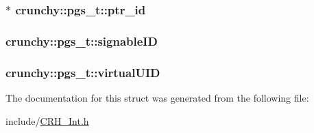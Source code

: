 \subsubsection[{ptr\+\_\+id}]{$\ast$ crunchy\+::pgs\+\_\+t\+::ptr\+\_\+id}\hypertarget{structcrunchy_1_1pgs__t_ae7503cb4a27d99838883861d63750817}{}\label{structcrunchy_1_1pgs__t_ae7503cb4a27d99838883861d63750817}
\subsubsection[{signable\+ID}]{ crunchy\+::pgs\+\_\+t\+::signable\+ID}\hypertarget{structcrunchy_1_1pgs__t_a9a56b73215866d5bde8455f7752e9572}{}\label{structcrunchy_1_1pgs__t_a9a56b73215866d5bde8455f7752e9572}
\subsubsection[{virtual\+U\+ID}]{ crunchy\+::pgs\+\_\+t\+::virtual\+U\+ID}\hypertarget{structcrunchy_1_1pgs__t_a826bb981b0483387e8c5ae31c0ed106f}{}\label{structcrunchy_1_1pgs__t_a826bb981b0483387e8c5ae31c0ed106f}


The documentation for this struct was generated from the following file\+:\begin{DoxyCompactItemize}
\item 
include/\hyperlink{_c_r_h___int_8h}{C\+R\+H\+\_\+\+Int.\+h}\end{DoxyCompactItemize}
